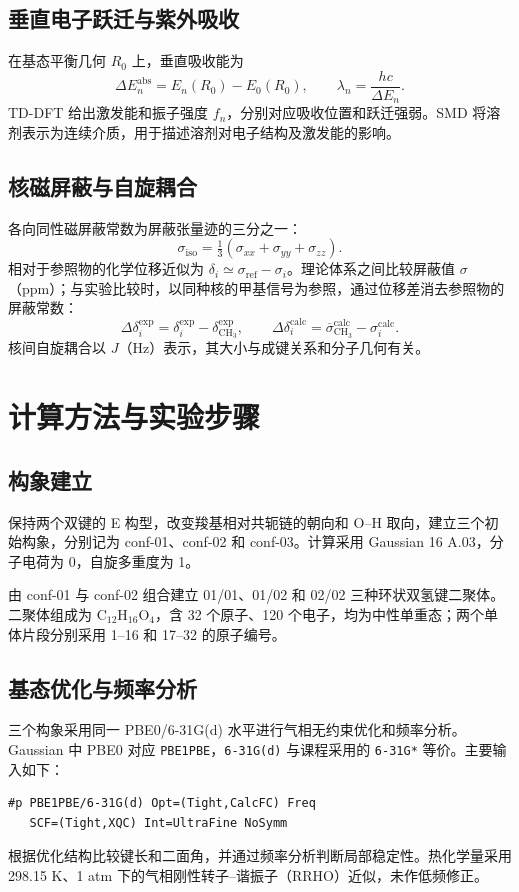 \documentclass[a4paper,12pt]{article}
\begin{document}
\subsection{垂直电子跃迁与紫外吸收}
在基态平衡几何 $R_0$ 上，垂直吸收能为
\begin{equation}
\Delta E_n^{\mathrm{abs}}=E_n(R_0)-E_0(R_0),\qquad
\lambda_n=\frac{hc}{\Delta E_n}.
\end{equation}
TD-DFT 给出激发能和振子强度 $f_n$，分别对应吸收位置和跃迁强弱。SMD 将溶剂表示为连续介质，用于描述溶剂对电子结构及激发能的影响。

\subsection{核磁屏蔽与自旋耦合}
各向同性磁屏蔽常数为屏蔽张量迹的三分之一：
\begin{equation}
\sigma_{\mathrm{iso}}=\tfrac13(\sigma_{xx}+\sigma_{yy}+\sigma_{zz}).
\end{equation}
相对于参照物的化学位移近似为 $\delta_i\simeq\sigma_{\mathrm{ref}}-\sigma_i$。理论体系之间比较屏蔽值 $\sigma$（ppm）；与实验比较时，以同种核的甲基信号为参照，通过位移差消去参照物的屏蔽常数：
\begin{equation}
\Delta\delta_i^{\mathrm{exp}}=\delta_i^{\mathrm{exp}}-\delta_{\mathrm{CH_3}}^{\mathrm{exp}},\qquad
\Delta\delta_i^{\mathrm{calc}}=\overline{\sigma}_{\mathrm{CH_3}}^{\mathrm{calc}}-\sigma_i^{\mathrm{calc}}.
\label{eq:relative-shift}
\end{equation}
核间自旋耦合以 $J$（Hz）表示，其大小与成键关系和分子几何有关。

\clearpage
\section{计算方法与实验步骤}
\subsection{构象建立}
保持两个双键的 E 构型，改变羧基相对共轭链的朝向和 O--H 取向，建立三个初始构象，分别记为 conf-01、conf-02 和 conf-03。计算采用 Gaussian 16 A.03，分子电荷为 0，自旋多重度为 1。

由 conf-01 与 conf-02 组合建立 01/01、01/02 和 02/02 三种环状双氢键二聚体。二聚体组成为 $\mathrm{C_{12}H_{16}O_4}$，含 32 个原子、120 个电子，均为中性单重态；两个单体片段分别采用 1--16 和 17--32 的原子编号。

\subsection{基态优化与频率分析}
三个构象采用同一 PBE0/6-31G(d) 水平进行气相无约束优化和频率分析。Gaussian 中 PBE0 对应 \texttt{PBE1PBE}，\texttt{6-31G(d)} 与课程采用的 \texttt{6-31G*} 等价。主要输入如下：
\begin{lstlisting}
#p PBE1PBE/6-31G(d) Opt=(Tight,CalcFC) Freq
   SCF=(Tight,XQC) Int=UltraFine NoSymm
\end{lstlisting}
根据优化结构比较键长和二面角，并通过频率分析判断局部稳定性。热化学量采用 298.15 K、1 atm 下的气相刚性转子--谐振子（RRHO）近似，未作低频修正。
\end{document}
